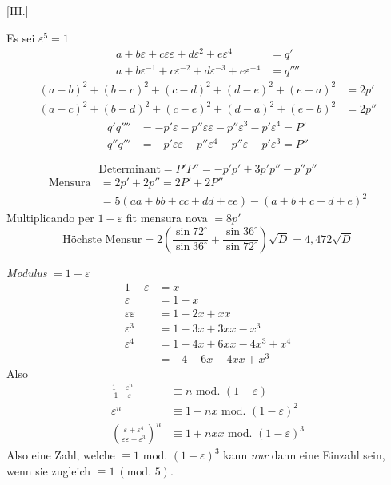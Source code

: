 %
\begin{center}[III.]\end{center}
Es sei $\varepsilon^5=1$
\[
\begin{aligned}
a+b\varepsilon+c\varepsilon\varepsilon+d\varepsilon^2+e\varepsilon^4&=q'\\
a+b\varepsilon^{-1}+c\varepsilon^{-2}+d\varepsilon^{-3}+e\varepsilon^{-4}&=q''''
\end{aligned}
\]
\[
\begin{aligned}
(a-b)^2+(b-c)^2+(c-d)^2+(d-e)^2+(e-a)^2&=2p'\\
(a-c)^2+(b-d)^2+(c-e)^2+(d-a)^2+(e-b)^2&=2p''
\end{aligned}
\]
\[
\begin{aligned}
q'q''''&=-p'\varepsilon-p''\varepsilon\varepsilon-p''\varepsilon^3-p'\varepsilon^4=P'\\
q''q'''&=-p'\varepsilon\varepsilon-p''\varepsilon^4-p''\varepsilon-p'\varepsilon^3=P''
\end{aligned}
\]

\[
\text{Determinant}=P'P''=-p'p'+3p'p''-p''p''
\]
\[
\begin{aligned}
\text{Mensura}&=2p'+2p''=2P'+2P''\\
&=5(aa+bb+cc+dd+ee)-(a+b+c+d+e)^2
\end{aligned}
\]
Multiplicando per $1-\varepsilon$ fit mensura nova $=8p'$
\[
\text{Höchste Mensur}=2\left(\frac{\sin72^\circ}{\sin36^\circ}+\frac{\sin36^\circ}{\sin72^\circ}\right)\surd D=4{,}472\surd D
\]

\emph{Modulus} $=1-\varepsilon$
\[
\begin{aligned}
1-\varepsilon&=x\\
\varepsilon&=1-x\\
\varepsilon\varepsilon&=1-2x+xx\\
\varepsilon^3&=1-3x+3xx-x^3\\
\varepsilon^4&=1-4x+6xx-4x^3+x^4\\
&=-4+6x-4xx+x^3
\end{aligned}
\]
Also
\[
\begin{aligned}
\frac{1-\varepsilon^n}{1-\varepsilon}&\equiv n\text{ mod. }(1-\varepsilon)\\
\varepsilon^n&\equiv1-nx\text{ mod. }(1-\varepsilon)^2\\
\left(\frac{\varepsilon+\varepsilon^4}{\varepsilon\varepsilon+\varepsilon^3}\right)^n&\equiv1+nxx\text{ mod. }(1-\varepsilon)^3
\end{aligned}
\]
Also eine Zahl, welche $\equiv1\text{ mod. }(1-\varepsilon)^3$ kann \emph{nur} dann eine Einzahl sein, wenn sie zugleich $\equiv1\ (\text{mod. }5)$.

